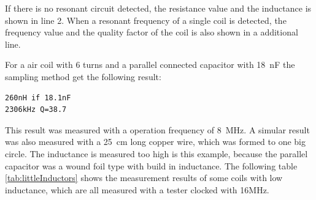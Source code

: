 If there is no resonant circuit detected, the resistance value and the inductance is shown
in line 2.
When a resonant frequency of a single coil is detected, the frequency value and the
quality factor of the coil is also shown in a additional line.

For a air coil with 6 turns and a parallel connected capacitor with 18~nF
the sampling method get the following result:

\begin{verbatim}
260nH if 18.1nF
2306kHz Q=38.7
\end{verbatim}

This result was measured with a operation frequency of 8~MHz. A simular result
was also measured with a 25~cm long copper wire, which was formed to one big circle.
The inductance is measured too high is this example, because the parallel capacitor
was a wound foil type with build in inductance.
The following table \ref{tab:littleInductors} shows the measurement results of some
coils with low inductance, which are all measured with a tester clocked with 16MHz.

